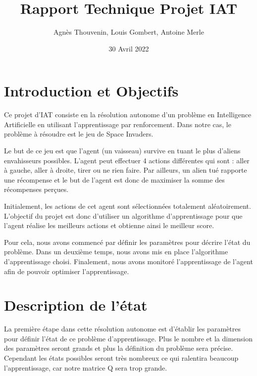 \documentclass{article}
\title{Rapport Technique Projet IAT}
\author{Agnès Thouvenin, Louis Gombert, Antoine Merle}
\date{30 Avril 2022}
\begin{document}
\maketitle

\section{Introduction et Objectifs}
Ce projet d'IAT consiste en la résolution autonome d'un problème en Intelligence Artificielle en utilisant l'apprentissage par renforcement. Dans notre cas, le problème à résoudre est le jeu de Space Invaders. 
\newline

Le but de ce jeu est que l'agent (un vaisseau) survive en tuant le plus d'aliens envahisseurs possibles. L'agent peut effectuer 4 actions différentes qui sont : aller à gauche, aller à droite, tirer ou ne rien faire. Par ailleurs, un alien tué rapporte une récompense et le but de l'agent est donc de maximiser la somme des récompenses perçues.
\newline

Initialement, les actions de cet agent sont sélectionnées totalement aléatoirement. L'objectif du projet est donc d'utiliser un algorithme d'apprentissage pour que l'agent réalise les meilleurs actions et obtienne ainsi le meilleur score.
\newline

Pour cela, nous avons commencé par définir les paramètres pour décrire l'état du problème. Dans un deuxième temps, nous avons mis en place l'algorithme d'apprentissage choisi. Finalement, nous avons monitoré l'apprentissage de l'agent afin de pouvoir optimiser l'apprentissage.

\section{Description de l'état}
La première étape dans cette résolution autonome est d'établir les paramètres pour définir l'état de ce problème d'apprentissage. Plus le nombre et la dimension des paramètres seront grands et plus la définition du problème sera précise. Cependant les états possibles seront très nombreux ce qui ralentira beaucoup l'apprentissage, car notre matrice Q sera trop grande. 
\newline
\end{document}
